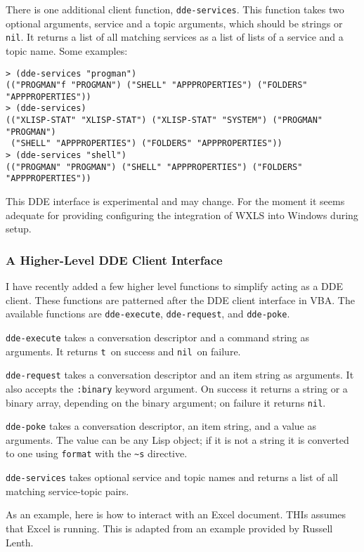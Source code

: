 \documentclass[11pt]{article}
\newcommand{\lfun}[1]{{\tt #1}}
\newcommand{\lkeyword}[1]{{\tt :#1}}
\newcommand{\NIL}{{\tt nil}}
\newcommand{\TRUE}{{\tt t}}
\begin{document}
There is one additional client function, \lfun{dde-services}.  This
function takes two optional arguments, service and a topic arguments,
which should be strings or \NIL. It returns a list of all matching
services as a list of lists of a service and a topic name.  Some
examples:
\begin{verbatim}
> (dde-services "progman")
(("PROGMAN"f "PROGMAN") ("SHELL" "APPPROPERTIES") ("FOLDERS" "APPPROPERTIES"))
> (dde-services)
(("XLISP-STAT" "XLISP-STAT") ("XLISP-STAT" "SYSTEM") ("PROGMAN" "PROGMAN")
 ("SHELL" "APPPROPERTIES") ("FOLDERS" "APPPROPERTIES"))
> (dde-services "shell")
(("PROGMAN" "PROGMAN") ("SHELL" "APPPROPERTIES") ("FOLDERS" "APPPROPERTIES"))

\end{verbatim}

This DDE interface is experimental and may change. For the moment it
seems adequate for providing configuring the integration of WXLS into
Windows during setup.

\subsubsection{A Higher-Level DDE Client Interface}
I have recently added a few higher level functions to simplify acting
as a DDE client.  These functions are patterned after the DDE client
interface in VBA.  The available functions are \lfun{dde-execute},
\lfun{dde-request}, and \lfun{dde-poke}.

\lfun{dde-execute} takes a conversation descriptor and a command
string as arguments. It returns \TRUE\ on success and \NIL\ on
failure.

\lfun{dde-request} takes a conversation descriptor and an item string
as arguments.  It also accepts the \lkeyword{binary} keyword argument.
On success it returns a string or a binary array, depending on the
binary argument; on failure it returns \NIL.

\lfun{dde-poke} takes a conversation descriptor, an item string, and a
value as arguments.  The value can be any Lisp object; if it is not a
string it is converted to one using \lfun{format} with the \verb|~s|
directive.

\lfun{dde-services} takes optional service and topic names and returns
a list of all matching service-topic pairs.

As an example, here is how to interact with an Excel document.  THIs
assumes that Excel is running.  This is adapted from an example
provided by Russell Lenth.
\end{document}
